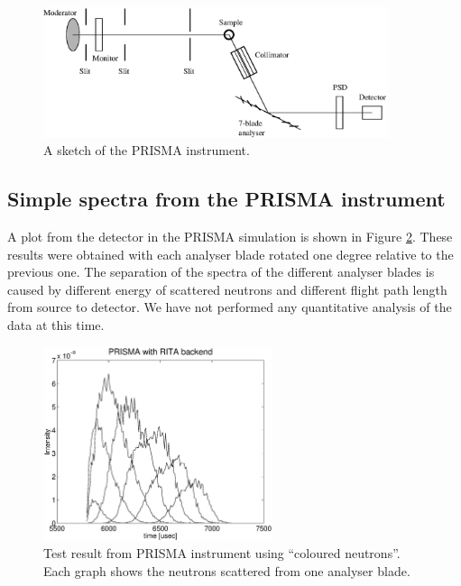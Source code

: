 \begin{figure}[h]
  \begin{center}
    \includegraphics[width=0.9\textwidth]{figures/prisma2.eps}
  \end{center}
\caption{A sketch of the PRISMA instrument.}
\label{f:PRISMA}
\end{figure}

\subsection{Simple spectra from the PRISMA instrument}
\label{data:PRISMA}

A plot from the detector in the PRISMA simulation is shown in Figure
\ref{f:PRISMAdata}. These results were obtained with each analyser blade
rotated one degree relative to the previous one. The separation of the
spectra of the different analyser blades is caused by different energy
of scattered neutrons and different flight path length from source to
detector.  We have not performed any quantitative analysis of the data at this
time.

\begin{figure}
  \begin{center}
    \includegraphics[width=0.6\textwidth]{figures/prisma2-a.eps}
  \end{center}
\caption{Test result from PRISMA instrument using ``coloured
  neutrons''. Each graph shows the neutrons scattered from one analyser blade.}
\label{f:PRISMAdata}
\end{figure}
